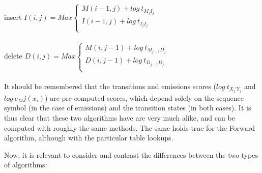 insert	$ I(i,j) = Max 	\begin{cases}
					M(i-1,j) + log\ t_{M_{j} I_j}	\\
					I(i-1,j) + log\ t_{I_{j} I_j}	\\
				\end{cases} $ \\
\\

delete	$ D(i,j) = Max	\begin{cases}
					M(i,j-1) + log\ t_{M_{j-1} D_j} \\
					D(i,j-1) + log\ t_{D_{j-1} D_j} \\
				\end{cases} $ \\ 
\\
It should be remembered that the transitions and emissions scores ($ log\ t_{X_j' Y_j} $ and $ log\ {e_Mj(x_i)} $) are pre-computed scores, which depend solely on the sequence symbol (in the case of emissions) and the transition states (in both cases).
It is thus clear that these two algorithms have are very much alike, and can be computed with roughly the same methods. The same holds true for the Forward algorithm, although with the particular table lookups.

Now, it is relevant to consider and contrast the differences between the two types of algorithms:

